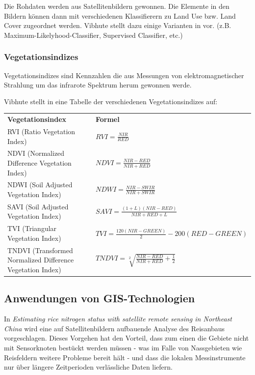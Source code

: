 Die Rohdaten werden aus Satellitenbildern gewonnen. Die Elemente in den Bildern können dann mit verschiedenen Klassifierern zu Land Use bzw. Land Cover zugeordnet werden. Vibhute stellt dazu einige Varianten in \cite{jour:Vibhute2013} vor. (z.B. Maximum-Likelyhood-Classifier, Supervised Classifier, etc.)

\subsubsection{Vegetationsindizes} 
Vegetationsindizes sind Kennzahlen die aus Messungen von elektromagnetischer Strahlung um das infrarote Spektrum herum gewonnen werde.\cite{jour:Jackson1991}

Vibhute stellt in \cite{jour:Vibhute2013} eine Tabelle der verschiedenen Vegetationsindizes auf:

\begin{table}[h]
\begin{tabular}{|p{5cm}|p{9cm}|}
\textbf{Vegetationsindex}                                  & \textbf{Formel} \\
RVI (Ratio Vegetation Index)                               & $RVI = \frac{NIR}{RED}$                 \\
NDVI (Normalized Difference Vegetation Index)              & $NDVI = \frac{NIR - RED}{NIR + RED}$                \\
NDWI (Soil Adjusted Vegetation Index)                      & $NDWI = \frac{NIR - SWIR}{NIR + SWIR}$                \\
SAVI (Soil Adjusted Vegetation Index)                      & $SAVI = \frac{(1 + L)(NIR - RED)}{NIR + RED + L}$                \\
TVI (Triangular Vegetation Index)                          & $TVI = \frac{120 (NIR - GREEN)}{2} - 200 (RED - GREEN)$                \\
TNDVI (Transformed Normalized Difference Vegetation Index) & $TNDVI = \sqrt[2]{\frac{NIR - RED}{NIR + RED} + \frac{1}{2}}$               
\end{tabular}
\end{table}

\subsection{Anwendungen von GIS-Technologien}

In \textit{Estimating rice nitrogen status with satellite remote sensing in Northeast China} wird eine auf Satellitenbildern aufbauende Analyse des Reisanbaus vorgeschlagen. Dieses Vorgehen hat den Vorteil, dass zum einen die Gebiete nicht mit Sensorknoten bestückt werden müssen - was im Falle von Nassgebieten wie Reisfeldern weitere Probleme bereit hält - und dass die lokalen Messinstrumente nur über längere Zeitperioden verlässliche Daten liefern.\cite{jour:Huang2013} 

